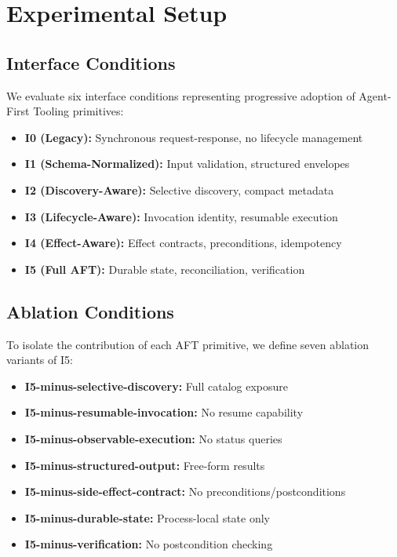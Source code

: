 
\section{Experimental Setup}

\subsection{Interface Conditions}
We evaluate six interface conditions representing progressive adoption of Agent-First Tooling primitives:

\begin{itemize}
    \item \textbf{I0 (Legacy):} Synchronous request-response, no lifecycle management
    \item \textbf{I1 (Schema-Normalized):} Input validation, structured envelopes
    \item \textbf{I2 (Discovery-Aware):} Selective discovery, compact metadata
    \item \textbf{I3 (Lifecycle-Aware):} Invocation identity, resumable execution
    \item \textbf{I4 (Effect-Aware):} Effect contracts, preconditions, idempotency
    \item \textbf{I5 (Full AFT):} Durable state, reconciliation, verification
\end{itemize}

\subsection{Ablation Conditions}
To isolate the contribution of each AFT primitive, we define seven ablation variants of I5:

\begin{itemize}
    \item \textbf{I5-minus-selective-discovery:} Full catalog exposure
    \item \textbf{I5-minus-resumable-invocation:} No resume capability
    \item \textbf{I5-minus-observable-execution:} No status queries
    \item \textbf{I5-minus-structured-output:} Free-form results
    \item \textbf{I5-minus-side-effect-contract:} No preconditions/postconditions
    \item \textbf{I5-minus-durable-state:} Process-local state only
    \item \textbf{I5-minus-verification:} No postcondition checking
\end{itemize}

